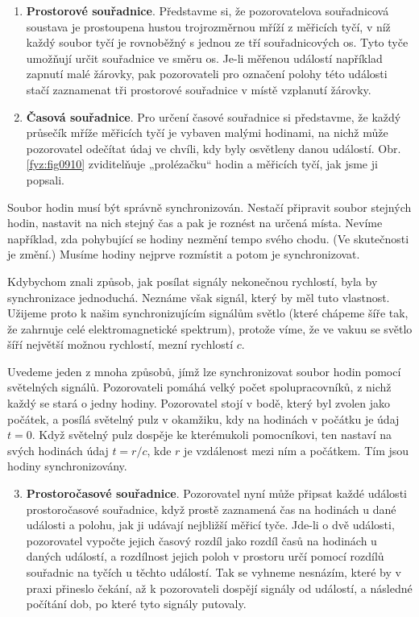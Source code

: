     \begin{enumerate}[noitemsep]
      \item \textbf{Prostorové souřadnice}. Představme si, že pozorovatelova souřadnicová soustava
            je prostoupena hustou trojrozměrnou mříží z měřicích tyčí, v níž každý soubor tyčí je
            rovnoběžný s jednou ze tří souřadnicových os. Tyto tyče umožňují určit souřadnice ve
            směru os. Je-li měřenou událostí například zapnutí malé žárovky, pak pozorovateli pro
            označení polohy této události stačí zaznamenat tři prostorové souřadnice v místě
            vzplanutí žárovky.
      \item \textbf{Časová souřadnice}. Pro určení časové souřadnice si představme, že každý
            průsečík mříže měřicích tyčí je vybaven malými hodinami, na nichž může pozorovatel
            odečítat údaj ve chvíli, kdy byly osvětleny danou událostí. Obr. \ref{fyz:fig0910}
            zviditelňuje „prolézačku“ hodin a měřicích tyčí, jak jsme ji popsali.
    \end{enumerate}

    Soubor hodin musí být správně synchronizován. Nestačí připravit soubor stejných hodin, nastavit
    na nich stejný čas a pak je roznést na určená místa. Nevíme například, zda pohybující se hodiny
    nezmění tempo svého chodu. (Ve skutečnosti je změní.) Musíme hodiny nejprve rozmístit a potom je
    synchronizovat.

    Kdybychom znali způsob, jak posílat signály nekonečnou rychlostí, byla by synchronizace
    jednoduchá. Neznáme však signál, který by měl tuto vlastnost. Užijeme proto k našim
    synchronizujícím signálům světlo (které chápeme šíře tak, že zahrnuje celé elektromagnetické
    spektrum), protože víme, že ve vakuu se světlo šíří největší možnou rychlostí, mezní rychlostí
    \(c\).

    Uvedeme jeden z mnoha způsobů, jímž lze synchronizovat soubor hodin pomocí světelných signálů.
    Pozorovateli pomáhá velký počet spolupracovníků, z nichž každý se stará o jedny hodiny.
    Pozorovatel stojí v bodě, který byl zvolen jako počátek, a posílá světelný pulz v okamžiku, kdy
    na hodinách v počátku je údaj \(t = 0\). Když světelný pulz dospěje ke kterémukoli pomocníkovi,
    ten nastaví na svých hodinách údaj \(t = r/c\), kde \(r\) je vzdálenost mezi ním a počátkem. Tím
    jsou hodiny synchronizovány.

    \begin{enumerate}[noitemsep]
      \setcounter{enumi}{2}
      \item \textbf{Prostoročasové souřadnice}. Pozorovatel nyní může připsat každé události
            prostoročasové souřadnice, když prostě zaznamená čas na hodinách u dané události a
            polohu, jak ji udávají nejbližší měřicí tyče. Jde-li o dvě události, pozorovatel vypočte
            jejich časový rozdíl jako rozdíl časů na hodinách u daných událostí, a rozdílnost jejich
            poloh v prostoru určí pomocí rozdílů souřadnic na tyčích u těchto událostí. Tak se
            vyhneme nesnázím, které by v praxi přineslo čekání, až k pozorovateli dospějí signály
            od událostí, a následné počítání dob, po které tyto signály putovaly.
    \end{enumerate}
  
